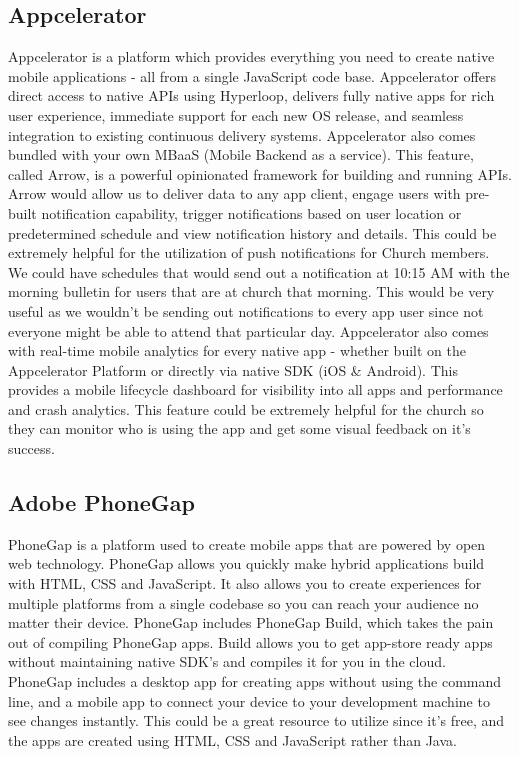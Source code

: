 \documentclass[letterpaper,10pt,draftclsnofoot,onecolumn,titlepage]{IEEEtran}
\begin{document}
		\subsection{Appcelerator}
			Appcelerator is a platform which provides everything you need to create native mobile applications - all from a single JavaScript code base.
			Appcelerator offers direct access to native APIs using Hyperloop, delivers fully native apps for rich user experience, immediate support for each new OS release, and seamless integration to existing continuous delivery systems.
			Appcelerator also comes bundled with your own MBaaS (Mobile Backend as a service).
			This feature, called Arrow, is a powerful opinionated framework for building and running APIs.
			Arrow would allow us to deliver data to any app client, engage users with pre-built notification capability, trigger notifications based on user location or predetermined schedule and view notification history and details.
			This could be extremely helpful for the utilization of push notifications for Church members.
			We could have schedules that would send out a notification at 10:15 AM with the morning bulletin for users that are at church that morning.
			This would be very useful as we wouldn't be sending out notifications to every app user since not everyone might be able to attend that particular day.
			Appcelerator also comes with real-time mobile analytics for every native app - whether built on the Appcelerator Platform or directly via native SDK (iOS \& Android).
			This provides a mobile lifecycle dashboard for visibility into all apps and performance and crash analytics.
			This feature could be extremely helpful for the church so they can monitor who is using the app and get some visual feedback on it's success.

		\subsection{Adobe PhoneGap}
			PhoneGap is a platform used to create mobile apps that are powered by open web technology.
			PhoneGap allows you quickly make hybrid applications build with HTML, CSS and JavaScript.
			It also allows you to create experiences for multiple platforms from a single codebase so you can reach your audience no matter their device.
			PhoneGap includes PhoneGap Build, which takes the pain out of compiling PhoneGap apps.
			Build allows you to get app-store ready apps without maintaining native SDK's and compiles it for you in the cloud.
			PhoneGap includes a desktop app for creating apps without using the command line, and a mobile app to connect your device to your development machine to see changes instantly.
			This could be a great resource to utilize since it's free, and the apps are created using HTML, CSS and JavaScript rather than Java.
\end{document}
